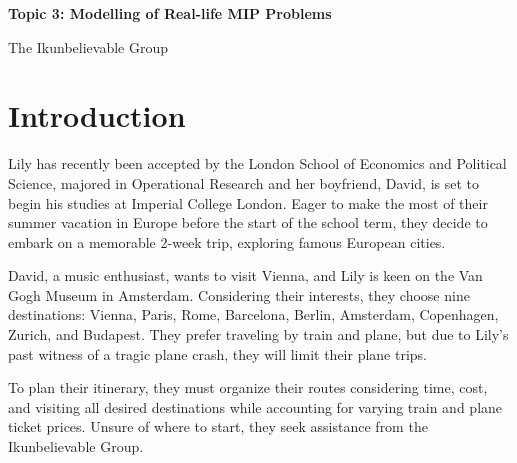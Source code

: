 \documentclass{article}
\newcommand{\titlefont}{\fontsize{21}{32}\selectfont}
\newcommand{\authorfont}{\fontsize{20.74}{24}\selectfont}
\begin{document}
\begin{titlepage}
  \centering
  \vspace*{5cm}
  {\titlefont\textbf{\color{black}Topic 3: Modelling of Real-life MIP Problems}\par}
  \vspace{1.5cm}
  {\authorfont\color{black} The Ikunbelievable Group\par}
  \vfill
\end{titlepage}

\tableofcontents
\clearpage

\renewcommand{\thefootnote}{\fnsymbol{footnote}}
\renewcommand{\thefootnote}{\arabic{footnote}}

\section{Introduction}

Lily has recently been accepted by the London School of Economics
and Political Science, majored in Operational Research and her boyfriend,
David, is set to begin his studies at Imperial College London. Eager to make
the most of their summer vacation in Europe before the start of the school
term, they decide to embark on a memorable 2-week trip, exploring famous
European cities.

David, a music enthusiast, wants to visit Vienna, and Lily is keen on the Van
Gogh Museum in Amsterdam. Considering their interests, they choose nine
destinations: Vienna, Paris, Rome, Barcelona, Berlin, Amsterdam, Copenhagen,
Zurich, and Budapest. They prefer traveling by train and plane, but due to
Lily's past witness of a tragic plane crash, they will limit their plane trips.

To plan their itinerary, they must organize their routes considering time,
cost, and visiting all desired destinations while accounting for varying train
and plane ticket prices. Unsure of where to start, they seek assistance from
the Ikunbelievable Group.
\end{document}
